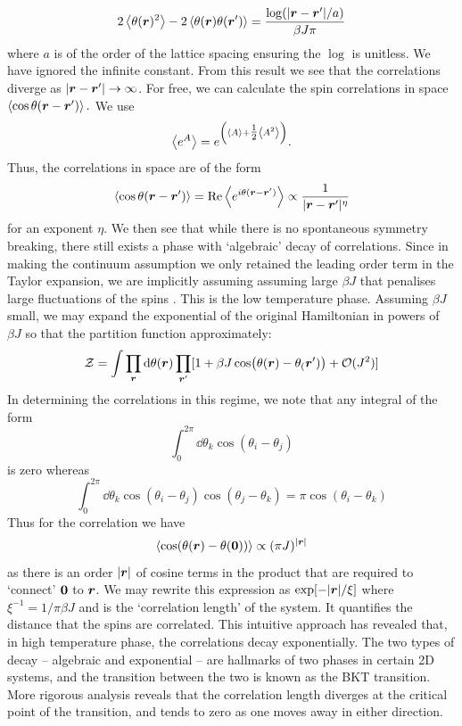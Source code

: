 \[
 2\left < \theta(\boldsymbol{r})^2 \right > - 2\left < \theta(\boldsymbol{r})\theta(\boldsymbol{r}') \right > =  \frac{\log(|\boldsymbol{r} - \boldsymbol{r}'|/a)}{\beta J  \pi}
\]
where $a$ is of the order of the lattice spacing ensuring the $\log$ is unitless. We have ignored the infinite constant. From this result we see that the correlations diverge as $|\boldsymbol{r} - \boldsymbol{r}'| \to \infty$.  For free, we can calculate the spin correlations in space $\left < \cos \theta(\boldsymbol{r} - \boldsymbol{r}') \right >.$ We use 
 \[
 \left < e^{A} \right > = e^{\left(\left < A \right > + \tfrac12 \left < A^2 \right >\right)}.
 \]
Thus, the correlations in space are of the form
\[
\left < \cos \theta (\boldsymbol{r} - \boldsymbol{r}') \right > = \Re \left < e^{i\theta (\boldsymbol{r} - \boldsymbol{r}')} \right > \propto \frac{1}{|\boldsymbol{r}- \boldsymbol{r}'|^{\eta}}
\]
for an exponent $\eta$. We then see that while there is no spontaneous symmetry breaking, there still exists a phase with `algebraic' decay of correlations. Since in making the continuum assumption we only retained the leading order term in the Taylor expansion, we are implicitly assuming assuming large $
\beta J$ that penalises large fluctuations of the spins \cite{altland2010condensed}. This is the low temperature phase. Assuming $\beta J$ small, we may expand the exponential of the original Hamiltonian in powers of $\beta J$ so that the partition function approximately: 
\[
\mathcal{Z} = \int  \prod_{\boldsymbol{r}} \dd{\theta(\boldsymbol{r})} \prod_{\boldsymbol{r}'} [1 + \beta J \cos(\theta(\boldsymbol{r}) - \theta_(\boldsymbol{r}')) + \mathcal{O}(J^2
)]\]
In determining the correlations in this regime, we note that any integral of the form 
\[
\int_{0}^{2\pi} \dd{\theta_k} \cos(\theta_i -\theta_j) 
\]
is zero whereas
\[
\int_{0}^{2\pi} \dd{\theta_k} \cos(\theta_i -\theta_j)\cos(\theta_j - \theta_k)= \pi \cos(\theta_i - \theta_k)
\]
Thus for the correlation we have 
\[
\left < \cos(\theta(\boldsymbol{r})- \theta(\boldsymbol{0})) \right > \propto (\pi J)^{|\boldsymbol{r}|}
\]
as there is an order $|\boldsymbol{r}|$ of cosine terms in the product that are required to `connect' $\boldsymbol{0}$ to $\boldsymbol{r}$. 
We may rewrite this expression as $\exp[-|\boldsymbol{r}|/\xi]$ where $\xi^{-1} = 1/\pi \beta J$ and is the `correlation length' of the system. It quantifies the distance that the spins are correlated. This intuitive approach has revealed that, in high temperature phase, the correlations decay exponentially. The two types of decay -- algebraic and exponential -- are hallmarks of two phases in certain 2D systems, and the transition between the two is known as the BKT transition. More rigorous analysis reveals that the correlation length diverges at the critical point of the transition, and tends to zero as one moves away in either direction. 


